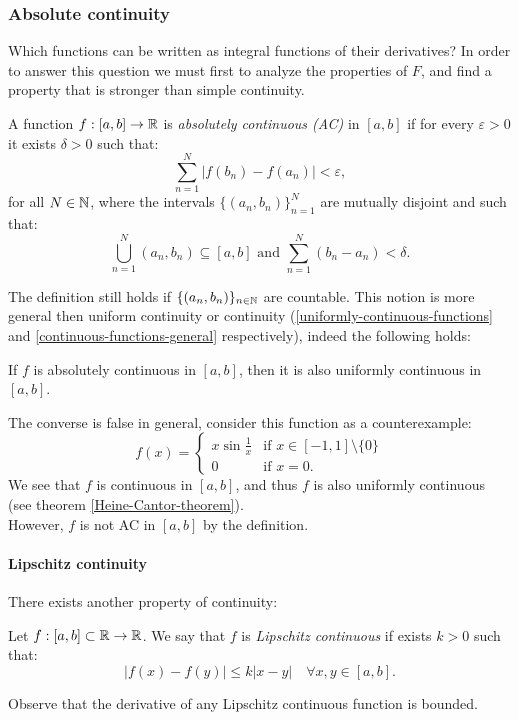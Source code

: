 \subsubsection{Absolute continuity}
Which functions can be written as integral functions of their derivatives? In order to answer this question we must first to analyze the properties of $F$, and find a property that is stronger than simple continuity.

\begin{defn}\label{def:absolute-continuity}
	A function $f:[a,b]\to \mathbb R$ is \emph{absolutely continuous (AC)} in $[a,b]$ if for every $\varepsilon > 0$ it exists $\delta > 0$ such that:
	$$
		\sum_{n=1}^{N} |f(b_n)-f(a_n)|
		< \varepsilon
	,
	$$
	for all $N\in \mathbb N$, where the intervals $\{(a_n,b_n)\}_{n=1}^N$ are mutually disjoint and such that:
	$$
		\bigcup_{n=1}^{N} (a_n, b_n) 
		\subseteq [a,b] 
		\text{ and } \sum_{n=1}^{N} (b_n - a_n)
		< \delta
	.
	$$
\end{defn}

The definition still holds if $\{(a_n,b_n)\}_{n \in \mathbb N}$ are countable. This notion is more general then uniform continuity or continuity (\vref{uniformly-continuous-functions} and \vref{continuous-functions-general} respectively), indeed the following holds:
\begin{prop}
	If $f$ is absolutely continuous in $[a,b]$, then it is also uniformly continuous in $[a,b]$.
\end{prop}
The converse is false in general, consider this function as a counterexample:
$$
	f(x) = 
	\begin{cases}
		x \sin \frac 1 x & \text{if } x \in [-1,1]\setminus\{0\}\\
		0 & \text{if } x=0
	.
	\end{cases}
$$
We see that $f$ is continuous in $[a,b]$, and thus $f$ is also uniformly continuous (see theorem \vref{Heine-Cantor-theorem}).\\
However, $f$ is not AC in $[a,b]$ by the definition.

\paragraph{Lipschitz continuity} There exists another property of continuity:
\begin{defn}\label{defn-lipschitz-continuity}
	Let $f:[a,b] \subset \mathbb R \to \mathbb R$. We say that $f$ is \emph{Lipschitz continuous} if exists $k > 0$ such that:
	$$
		|f(x)-f(y)| \leq k|x-y| 
		\quad \forall x,y \in [a,b]
	.
	$$
\end{defn}
Observe that the derivative of any Lipschitz continuous function is bounded.

